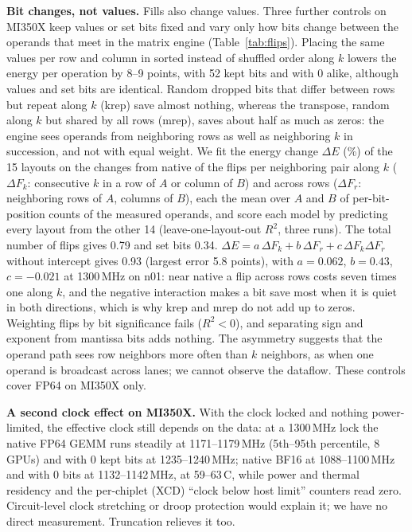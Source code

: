 \documentclass[conference]{IEEEtran}
\begin{document}
\textbf{Bit changes, not values.} Fills also change values. Three further controls on MI350X keep values or set bits
fixed and vary only how bits change between the operands that meet in the matrix engine (Table~\ref{tab:flips}).
Placing the same values per row and column in sorted instead of shuffled order along $k$ lowers the energy per operation
by 8--9 points, with 52 kept bits and with 0 alike, although values and set bits are identical. Random dropped bits that
differ between rows but repeat along $k$ (krep) save almost nothing, whereas the transpose, random along $k$ but shared by
all rows (mrep), saves about half as much as zeros: the engine sees operands from neighboring rows as well as
neighboring $k$ in succession, and not with equal weight. We fit the energy change $\Delta E$ (\%) of the 15 layouts on
the changes from native of the flips per neighboring pair along $k$ ($\Delta F_k$: consecutive $k$ in a row of $A$ or
column of $B$) and across rows ($\Delta F_r$: neighboring rows of $A$, columns of $B$), each the mean over $A$ and $B$
of per-bit-position counts of the measured operands, and score each model by predicting every layout from the other 14
(leave-one-layout-out $R^2$, three runs). The total number of flips gives 0.79 and set bits 0.34.
$\Delta E=a\,\Delta F_k+b\,\Delta F_r+c\,\Delta F_k\Delta F_r$ without intercept gives 0.93 (largest error 5.8 points), with
$a=0.062$, $b=0.43$, $c=-0.021$ at 1300\,MHz on n01: near native a flip across rows costs seven times one along $k$, and
the negative interaction makes a bit save most when it is quiet in both directions,
which is why krep and mrep do not add up to zeros. Weighting flips by bit significance fails ($R^2<0$), and
separating sign and exponent from mantissa bits adds nothing. The asymmetry suggests that the operand path sees row
neighbors more often than $k$ neighbors, as when one operand is broadcast across lanes; we cannot observe the dataflow.
These controls cover FP64 on MI350X only.

\textbf{A second clock effect on MI350X.} With the clock locked and nothing power-limited, the effective clock still
depends on the data: at a 1300\,MHz lock the native FP64 GEMM runs steadily at 1171--1179\,MHz (5th--95th percentile, 8
GPUs) and with 0 kept bits at 1235--1240\,MHz; native BF16 at 1088--1100\,MHz and with 0 bits at 1132--1142\,MHz, at
59--63\,\textdegree C, while power and thermal residency and the per-chiplet (XCD) ``clock below host limit'' counters read zero.
Circuit-level clock stretching or droop protection would explain it; we have no direct measurement. Truncation relieves
it too.
\end{document}
